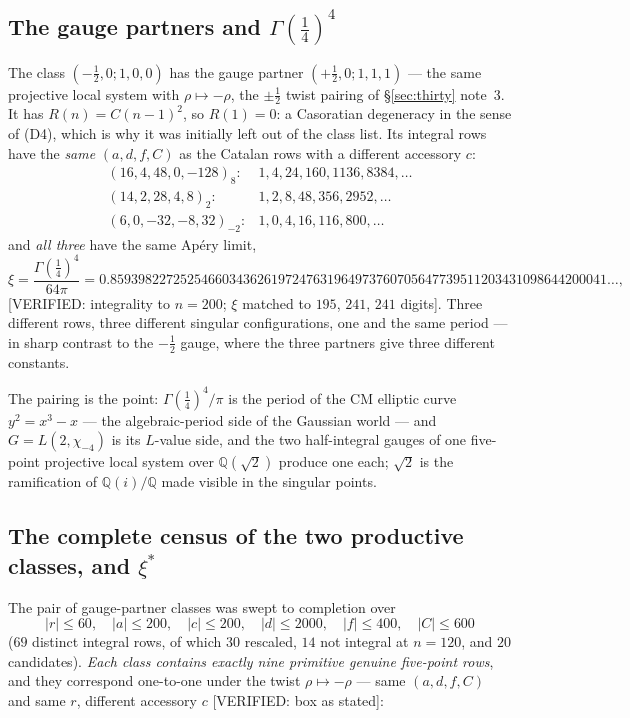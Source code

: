 \documentclass[11pt,reqno]{amsart}
\theoremstyle{plain}
\theoremstyle{definition}
\theoremstyle{remark}
\theoremstyle{plain}
\newcommand{\Q}{\mathbb{Q}}
\newcommand{\Verified}[1]{\textup{\textsf{[VERIFIED: #1]}}}
\begin{document}
\subsection{The gauge partners and $\Gamma(\tfrac14)^4$}\label{sec:gauge}
The class $(-\tfrac12,0;1,0,0)$ has the gauge partner $(+\tfrac12,0;1,1,1)$ ---
the same projective local system with $\rho\mapsto-\rho$, the $\pm\tfrac12$ twist
pairing of \S\ref{sec:thirty} note~3. It has $R(n)=C(n-1)^2$, so $R(1)=0$: a
Casoratian degeneracy in the sense of (D4), which is why it was initially left
out of the class list. Its integral rows have the \emph{same} $(a,d,f,C)$ as the
Catalan rows with a different accessory $c$:
\[
\begin{array}{llll}
(16,4,48,0,-128)_{8}:& 1,4,24,160,1136,8384,\dots\\
(14,2,28,4,8)_{2}:& 1,2,8,48,356,2952,\dots\\
(6,0,-32,-8,32)_{-2}:& 1,0,4,16,116,800,\dots
\end{array}
\]
and \emph{all three} have the same Ap\'ery limit,
\[
\xi=\frac{\Gamma(\tfrac14)^4}{64\pi}
 =0.85939822725254660343626197247631964973760705647739511203431098644200041\dots,
\]
\Verified{integrality to $n=200$; $\xi$ matched to $195$, $241$, $241$ digits}.
Three different rows, three different singular configurations, one and the same
period --- in sharp contrast to the $-\tfrac12$ gauge, where the three partners
give three different constants.

The pairing is the point: $\Gamma(\tfrac14)^4/\pi$ is the period of the CM
elliptic curve $y^2=x^3-x$ --- the algebraic-period side of the Gaussian world
--- and $G=L(2,\chi_{-4})$ is its $L$-value side, and the two half-integral
gauges of one five-point projective local system over $\Q(\sqrt2)$ produce one
each; $\sqrt2$ is the ramification of $\Q(i)/\Q$ made visible in the singular
points.

\subsection{The complete census of the two productive classes, and $\xi^*$}
\label{sec:xistar}
The pair of gauge-partner classes was swept to completion over
\[
|r|\le60,\quad |a|\le200,\quad |c|\le200,\quad |d|\le2000,\quad |f|\le400,
\quad |C|\le600
\]
($69$ distinct integral rows, of which $30$ rescaled, $14$ not integral at
$n=120$, and $20$ candidates). \emph{Each class contains exactly nine primitive
genuine five-point rows}, and they correspond one-to-one under the twist
$\rho\mapsto-\rho$ --- same $(a,d,f,C)$ and same $r$, different accessory $c$
\Verified{box as stated}:
\end{document}
